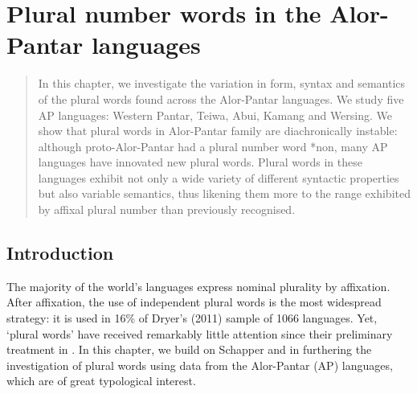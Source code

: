 
\chapter{Plural number words in the Alor-Pantar languages}


\begin{abstract}
In this chapter, we investigate the variation in form, syntax and semantics of the plural words found across the Alor-Pantar languages. We study five AP languages: Western Pantar, Teiwa, Abui, Kamang and Wersing. We show that plural words in Alor-Pantar family are diachronically instable: although proto-Alor-Pantar had a plural number word *non, many AP languages have innovated new plural words. Plural words in these languages exhibit not only a wide variety of different syntactic properties but also variable semantics, thus likening them more to the range exhibited by affixal plural number than previously recognised.

\end{abstract}


\section{Introduction}%
 
\hypertarget{Toc376962648}{}
The majority of the world's languages express nominal plurality by affixation. After affixation, the use of independent plural words is the most widespread strategy: it is used in 16\% of Dryer's (2011) sample of 1066 languages.\nocite{Dryer2011} Yet, `plural words' have received remarkably little attention since their preliminary treatment in \citet{Dryer1989}. In this chapter, we build on Schapper and \citet{Klamer2011} in furthering the investigation of plural words using data from the Alor-Pantar (AP) languages, which are of great typological interest.

